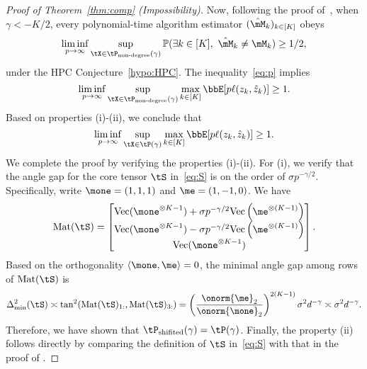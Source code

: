 \documentclass[lettersize,onecolumn,journal]{IEEEtran}
\theoremstyle{definition}
\theoremstyle{definition}
\newcommand{\Mat}{\text{Mat}}
\begin{document}
\begin{proof}[Proof of Theorem~\ref{thm:comp} (Impossibility)]
Now, following the proof of~\citet[Theorem 7]{han2020exact}, when $\gamma<-K/2$, every polynomial-time algorithm estimator $(\hat \mM_k)_{k\in[K]}$ obeys
\begin{align}\label{eq:p}
\liminf_{p\to \infty} \sup_{\tX\in \tP_{\text{non-degree}}(\gamma)}\mathbb{P}(\exists k \in[K],\  \hat \mM_k \neq \mM_k)\geq 1/2,
\end{align}
under the HPC Conjecture~\ref{hypo:HPC}.
The inequality~\eqref{eq:p} implies
\[
\liminf_{p\to \infty} \sup_{\tX\in \tP_{\text{non-degree}}(\gamma)}\max_{k\in[K]}\bbE[p\ell(z_k, \hat z_k)]\geq 1.
\]
Based on properties (i)-(ii), we conclude that
\[
\liminf_{p\to \infty} \sup_{\tX\in \tP(\gamma)}\max_{k\in[K]}\bbE[p\ell(z_k, \hat z_k)]\geq 1.
\]
We complete the proof by verifying the properties (i)-(ii). For (i), we verify that the angle gap for the core tensor $\tS$ in~\eqref{eq:S} is on the order of $\sigma p^{-\gamma/2}$. Specifically, write $\mone=(1,1,1)$ and $\me=(1,-1,0)$. We have
\[
\Mat(\tS)=
\begin{bmatrix}
\text{Vec}(\mone^{\otimes K-1})+\sigma p^{-\gamma/2}\text{Vec}\left(\me^{\otimes (K-1)}\right) \\
\text{Vec}(\mone^{\otimes K-1})-\sigma p^{-\gamma/2}\text{Vec}\left(\me^{\otimes (K-1)}\right) \\
\text{Vec}(\mone^{\otimes K-1})
\end{bmatrix}.
\]
Based on the orthogonality $\langle \mone, \me\rangle=0$, the minimal angle gap among rows of $\Mat(\tS)$ is
\begin{align}
\Delta^2_{\min}(\tS)\asymp \tan^2(\Mat(\tS)_{1:}, \Mat(\tS)_{3:})
=\left(\onorm{\me}_2 \over \onorm{\mone}_2\right)^{2(K-1)} \sigma^2 d^{-\gamma}\asymp \sigma^2 d^{-\gamma}.
\end{align}
Therefore, we have shown that $\tP_{\text{shifited}}(\gamma)=\tP(\gamma)$. Finally, the property (ii) follows directly by comparing the definition of $\tS$ in~\eqref{eq:S} with that in the proof of \citet[Theorem 7]{han2020exact}. 
\end{proof}
\end{document}
